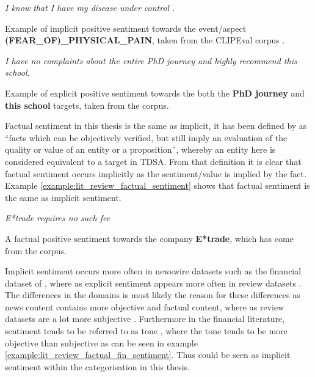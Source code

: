 \begin{example}
\textit{I know that I have my disease under control .}
\caption{Example of implicit positive sentiment towards the event\slash aspect \textbf{(FEAR\_OF)\_PHYSICAL\_PAIN}, taken from the CLIPEval corpus \citep{russo-etal-2015-semeval}.}
\label{example:lit_review_implicit_sentiment}
\end{example}

\begin{example}
\textit{I have no complaints about the entire PhD journey and highly recommend this school.}
\caption{Example of explicit positive sentiment towards the both the \textbf{PhD journey} and \textbf{this school} targets, taken from the \citet{toprak-etal-2010-sentence} corpus.}
\label{example:lit_review_explicit_sentiment}
\end{example}

Factual sentiment in this thesis is the same as implicit, it has been defined by \citet{toprak-etal-2010-sentence} as ``facts which can be objectively verified, but still imply an evaluation of the quality or value of an entity or a proposition'', whereby an entity here is considered equivalent to a target in TDSA. From that definition it is clear that factual sentiment occurs implicitly as the sentiment/value is implied by the fact. Example \ref{example:lit_review_factual_sentiment} shows that factual sentiment is the same as implicit sentiment.

\begin{example}
\textit{E*trade requires no such fee}
\caption{A factual positive sentiment towards the company \textbf{E*trade}, which has come from the \citet{toprak-etal-2010-sentence} corpus.}
\label{example:lit_review_factual_sentiment}
\end{example}

Implicit sentiment occurs more often in newswire datasets such as the financial dataset of \citet{van2015good}, where as explicit sentiment appears more often in review datasets \citep{toprak-etal-2010-sentence, maehlum-etal-2019-annotating, ovrelid2019fine}. The differences in the domains is most likely the reason for these  differences as news content contains more objective and factual content, where as review datasets are a lot more subjective \citep{van2015good}. Furthermore in the financial literature, sentiment tends to be referred to as tone \citep{el2019search}, where the tone tends to be more objective than subjective as can be seen in example \ref{example:lit_review_factual_fin_sentiment}. Thus could be seen as implicit sentiment within the categorisation in this thesis.

